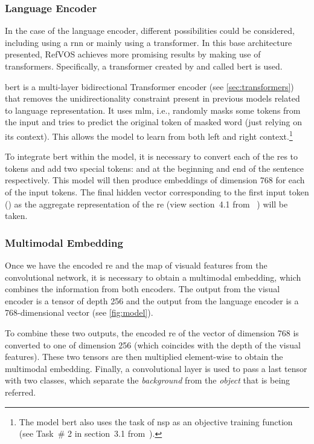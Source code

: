 \subsubsection{Language Encoder}
In the case of the language encoder, different possibilities could be
considered, including using a \gls{rnn} or mainly using a transformer. In this
base architecture presented, RefVOS achieves more promising results by making
use of transformers. Specifically, a transformer created by
 and called \gls{bert} is used.

\gls{bert} is a multi-layer bidirectional Transformer encoder (see
\vref{sec:transformers}) that removes the unidirectionality constraint present
in previous models related to language representation. It uses \gls{mlm}, i.e.,
randomly masks some tokens from the input and tries to predict the original
token of masked word (just relying on its context). This allows the model to
learn from both left and right context.\footnote{The model \gls{bert} also uses
  the task of \gls{nsp} as an objective training function (see Task~\# 2 in
  section~3.1 from~\cite{devlin19:bert}).}

To integrate \gls{bert} within the model, it is necessary to convert each of
the \glspl{re} to tokens and add two special tokens: \code{[CLS]} and
\code{[SEP]} at the beginning and end of the sentence respectively. This model
will then produce embeddings of dimension 768 for each of the input tokens. The
final hidden vector corresponding to the first input token (\code{[CLS]}) as
the aggregate representation of the \gls{re} (view section~4.1 from
~\cite{devlin19:bert}) will be taken.

\subsubsection{Multimodal Embedding}
Once we have the encoded \gls{re} and the map of visuald features from the
convolutional network, it is necessary to obtain a multimodal embedding, which
combines the information from both encoders. The output from the visual encoder
is a tensor of depth 256 and the output from the language encoder is a
768-dimensional vector (see \vref{fig:model}).

To combine these two outputs, the encoded \gls{re} of the vector of dimension
768 is converted to one of dimension 256 (which coincides with the depth of the
visual features). These two tensors are then multiplied element-wise to obtain
the multimodal embedding. Finally, a convolutional layer is used to pass a last
tensor with two classes, which separate the \emph{background} from the
\emph{object} that is being referred.



